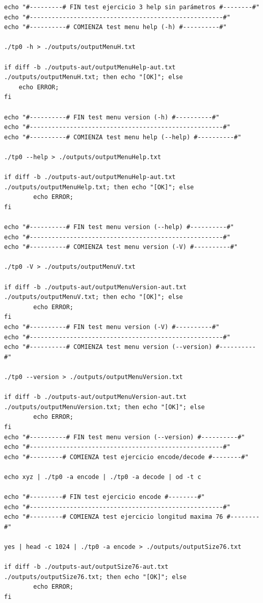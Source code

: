 \documentclass[10pt,a4paper]{article}
\begin{document}
\begin{lstlisting}
echo "#---------# FIN test ejercicio 3 help sin parámetros #--------#"
echo "#-----------------------------------------------------#"
echo "#----------# COMIENZA test menu help (-h) #----------#"

./tp0 -h > ./outputs/outputMenuH.txt

if diff -b ./outputs-aut/outputMenuHelp-aut.txt ./outputs/outputMenuH.txt; then echo "[OK]"; else
	echo ERROR;
fi

echo "#----------# FIN test menu version (-h) #----------#"
echo "#-----------------------------------------------------#"
echo "#----------# COMIENZA test menu help (--help) #----------#"

./tp0 --help > ./outputs/outputMenuHelp.txt

if diff -b ./outputs-aut/outputMenuHelp-aut.txt ./outputs/outputMenuHelp.txt; then echo "[OK]"; else
		echo ERROR;
fi

echo "#----------# FIN test menu version (--help) #----------#"
echo "#-----------------------------------------------------#"
echo "#----------# COMIENZA test menu version (-V) #----------#"

./tp0 -V > ./outputs/outputMenuV.txt

if diff -b ./outputs-aut/outputMenuVersion-aut.txt ./outputs/outputMenuV.txt; then echo "[OK]"; else
		echo ERROR;
fi
echo "#----------# FIN test menu version (-V) #----------#"
echo "#-----------------------------------------------------#"
echo "#----------# COMIENZA test menu version (--version) #----------#"

./tp0 --version > ./outputs/outputMenuVersion.txt

if diff -b ./outputs-aut/outputMenuVersion-aut.txt ./outputs/outputMenuVersion.txt; then echo "[OK]"; else
		echo ERROR;
fi
echo "#----------# FIN test menu version (--version) #----------#"
echo "#-----------------------------------------------------#"
echo "#---------# COMIENZA test ejercicio encode/decode #--------#"

echo xyz | ./tp0 -a encode | ./tp0 -a decode | od -t c

echo "#---------# FIN test ejercicio encode #--------#"
echo "#-----------------------------------------------------#"
echo "#---------# COMIENZA test ejercicio longitud maxima 76 #--------#"

yes | head -c 1024 | ./tp0 -a encode > ./outputs/outputSize76.txt

if diff -b ./outputs-aut/outputSize76-aut.txt ./outputs/outputSize76.txt; then echo "[OK]"; else
		echo ERROR;
fi


\end{lstlisting}
\end{document}
